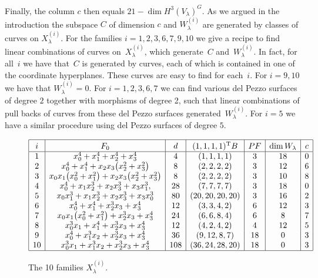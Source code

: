 \documentclass[pdftex]{sigma}
\numberwithin{equation}{section}
\begin{document}
Finally, the column $c$ then equals $21-\dim H^3(V_\lambda)^G$. As we argued in the introduction the subspace $C$ of dimension $c$ and $W_\lambda^{(i)}$ are generated by classes of curves on $X^{(i)}_\lambda$. For the families $i=1,2,3,6,7,9,10$ we give a recipe to f\/ind linear combinations of curves on~$X^{(i)}_\lambda$, which generate~$C$ and~$W_\lambda^{(i)}$. In fact, for all~$i$ we have that~$C$ is generated by curves, each of which is contained in one of the coordinate hyperplanes. These curves are easy to f\/ind for each~$i$. For $i=9,10$ we have that $W_{\lambda}^{(i)}=0$. For $i=1,2,3,6,7$ we can f\/ind various del Pezzo surfaces of degree $2$ together with morphisms of degree 2, such that linear combinations of pull backs of curves from these del Pezzo surfaces generated~$W_\lambda^{(i)}$. For $i=5$ we have a similar procedure using del Pezzo surfaces of degree $5$.
\begin{figure}[t]
\begin{gather*}
\begin{array}{|c|c|c|c|c|c|c|}
\hline
i& F_0 & d& (1,1,1,1)^{\rm T}\vphantom{\big|^2} B & PF &\dim W_\lambda & c \\
\hline
1&x_0^4+x_1^4+x_2^4+x_3^4 & 4&(1,1,1,1) & 3 & 18 & 0 \\
 2&x_0^4+x_1^4+x_2x_3\big(x_2^2+x_3^2\big) & 8&(2,2,2,2) &3 & 12 & 6 \\
 3& x_0x_1\big(x_0^2+x_1^2\big)+x_2x_3\big(x_2^2+x_3^2\big) &8&(2,2,2,2) &3 & 10 & 8 \\
4& x_0^4+x_1x_2^3+x_2x_3^3+x_3x_1^3, & 28 &(7,7,7,7) &3 & 18 & 0 \\
5&x_0x_1^3+x_1 x_2^3+x_2x_3^3+x_3x_0^3& 80 &(20,20,20,20) &3& 16 & 2 \\
 6&x_0^4+x_1^4+x_2^3x_3+x_3^4 & 12&(3,3,4,2) &6 & 12 & 3 \\
 7& x_0x_1\big(x_0^2+x_1^2\big)+x_2^3x_3+x_3^4 & 24&(6,6,8,4) & 6 & 8 & 7 \\
 8&x_0^3x_1+x_1^4+x_2^3x_3+x_3^4 & 12&(4,2,4,2) &4 &12 & 5 \\
 9&x_0^4+x_1^3x_2+x_2^3x_3+x_3^4 & 36&(9,12,8,7) &18 & 0 & 3\\
 10&x_0^3x_1+x_1^3x_2+x_2^3x_3+x_3^4 & 108&(36,24,28,20) &18 & 0 & 3 \\
 \hline
\end{array}
\end{gather*}\vspace{-5mm}

\caption{The 10 families $X^{(i)}_\lambda$.}\label{tbl}
\end{figure}
\end{document}
